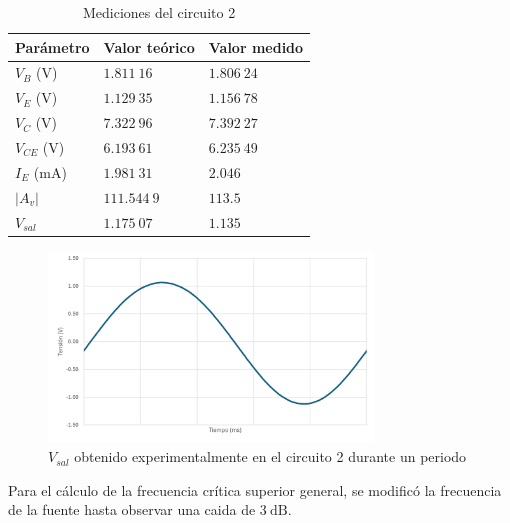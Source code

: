 \documentclass[journal]{IEEEtran}
\begin{document}
\begin{table}[H]
        \renewcommand{\arraystretch}{1.5}
        \caption{Mediciones del circuito 2}
        \centering
        \begin{tabular}{ >{\centering\arraybackslash}m{2.5cm} >{\centering\arraybackslash}m{2.5cm} >{\centering\arraybackslash}m{2.5cm} }
                \hline
            Parámetro & Valor teórico & Valor medido\\ 
            \hline
            $V_B$ ($\mathrm{V}$) & $1.811~16$  & $1.806~24$  \\ 
            $V_E$ ($\mathrm{V}$) & $1.129~35$  & $1.156~78$  \\
            $V_C$ ($\mathrm{V}$) & $7.322~96$  & $7.392~27$  \\
            $V_{CE}$ ($\mathrm{V}$) & $6.193~61$  & $6.235~49$  \\
            $I_E$ ($\mathrm{mA}$) & $1.981~31$  & $2.046$ \\ 
            $|A_v|$  & $111.544~9$ & $113.5$  \\
            $V_{sal}$ & $1.175~07$  & $1.135$ \\
            \hline
        \end{tabular}
        \label{tabla6}
    \end{table}

\begin{figure}[H]
        \centering
        \includegraphics[width=3.4in]{OutC2.png}
        \caption{$V_{sal}$ obtenido experimentalmente en el circuito 2 durante un periodo}
        \label{fig:SignalExperimental_02}
\end{figure}

Para el cálculo de la frecuencia crítica superior general, se modificó la frecuencia de la fuente hasta observar una caida de $3~\mathrm{dB}$.
\end{document}
